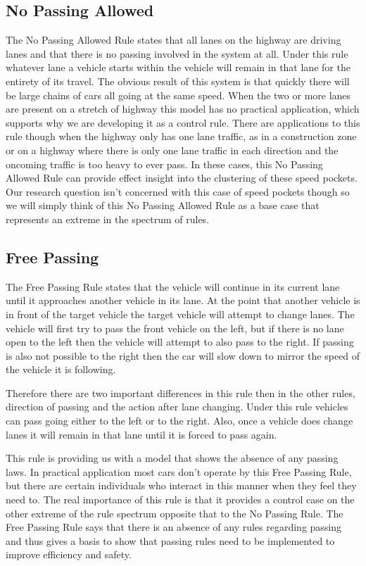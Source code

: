 \documentclass{amsart}
\begin{document}
	\subsection{No Passing Allowed}
	The No Passing Allowed Rule states that all lanes on the highway are driving lanes and that there is no passing involved in the system at all.  Under this rule whatever lane a vehicle starts within the vehicle will remain in that lane for the entirety of its travel.  The obvious result of this system is that quickly there will be large chains of cars all going at the same speed.  When the two or more lanes are present on a stretch of highway this model has no practical application, which supports why we are developing it as a control rule.  There are applications to this rule though when the highway only has one lane traffic, as in a construction zone or on a highway where there is only one lane traffic in each direction and the oncoming traffic is too heavy to ever pass.  In these cases, this No Passing Allowed Rule can provide effect insight into the clustering of these speed pockets.  Our research question isn’t concerned with this case of speed pockets though so we will simply think of this No Passing Allowed Rule as a base case that represents an extreme in the spectrum of rules.  
	\subsection{Free Passing}
	The Free Passing Rule states that the vehicle will continue in its current lane until it approaches another vehicle in its lane.  At the point that another vehicle is in front of the target vehicle the target vehicle will attempt to change lanes.  The vehicle will first try to pass the front vehicle on the left, but if there is no lane open to the left then the vehicle will attempt to also pass to the right.  If passing is also not possible to the right then the car will slow down to mirror the speed of the vehicle it is following. 

	Therefore there are two important differences in this rule then in the other rules, direction of passing and the action after lane changing.  Under this rule vehicles can pass going either to the left or to the right.  Also, once a vehicle does change lanes it will remain in that lane until it is forced to pass again.  

	This rule is providing us with a model that shows the absence of any passing laws.  In practical application most cars don’t operate by this Free Passing Rule, but there are certain individuals who interact in this manner when they feel they need to.  The real importance of this rule is that it provides a control case on the other extreme of the rule spectrum opposite that to the No Passing Rule.  The Free Passing Rule says that there is an absence of any rules regarding passing and thus gives a basis to show that passing rules need to be implemented to improve efficiency and safety. 
	
\end{document}
